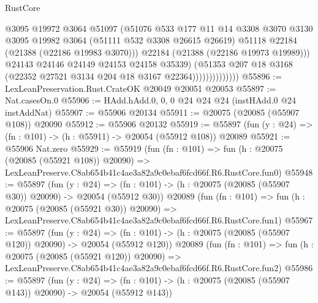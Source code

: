 \begin{lexlean}{RustCore}
\begin{coremodule}
                                @3095
                                @19972
                                @3064
                                @51097
                                (@51076
                                  @533
                                  @177
                                  @11
                                  @14
                                  @3308
                                  @3070
                                  @3130
                                  @3095
                                  @19982
                                  @3064
                                  (@51111 @532 @3308 @26615 @26619)
                                  @51118
                                  @22184
                                  (@21388 (@22186 @19983 @3070)))
                                @22184
                                (@21388 (@22186 @19973 @19989)))
                              @24143
                              @24146
                              @24149
                              @24153
                              @24158
                              @35339)
                            (@51353
                              @207
                              @18
                              @3168
                              (@22352 @27521 @3134 @204 @18 @3167 @22364))))))))))))))
@55896 := LexLeanPreservation.Rust.CrateOK @20049 @20051 @20053
@55897 := Nat.casesOn.{0}
@55906 := HAdd.hAdd.{0, 0, 0} @24 @24 @24 (instHAdd.{0} @24 instAddNat)
@55907 := @55906 @20134
@55911 := @20075 (@20085 (@55907 @108)) @20090
@55912 := @55906 @20132
@55919 := @55897 (fun (y : @24) => (fn : @101) -> (h : @55911) -> @20054 (@55912 @108)) @20089
@55921 := @55906 Nat.zero
@55929 := @55919
    (fun (fn : @101) =>
    fun (h : @20075 (@20085 (@55921 @108)) @20090) =>
    LexLeanPreserve.C8ab654b41c4ae3a82a9c0ebaf6fcd66f.R6.RustCore.fun0)
@55948 := @55897
    (fun (y : @24) =>
    (fn : @101) -> (h : @20075 (@20085 (@55907 @30)) @20090) -> @20054 (@55912 @30))
    @20089
    (fun (fn : @101) =>
    fun (h : @20075 (@20085 (@55921 @30)) @20090) =>
    LexLeanPreserve.C8ab654b41c4ae3a82a9c0ebaf6fcd66f.R6.RustCore.fun1)
@55967 := @55897
    (fun (y : @24) =>
    (fn : @101) -> (h : @20075 (@20085 (@55907 @120)) @20090) -> @20054 (@55912 @120))
    @20089
    (fun (fn : @101) =>
    fun (h : @20075 (@20085 (@55921 @120)) @20090) =>
    LexLeanPreserve.C8ab654b41c4ae3a82a9c0ebaf6fcd66f.R6.RustCore.fun2)
@55986 := @55897
    (fun (y : @24) =>
    (fn : @101) -> (h : @20075 (@20085 (@55907 @143)) @20090) -> @20054 (@55912 @143))

\end{coremodule}
\end{lexlean}
